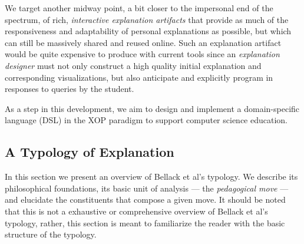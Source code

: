 \documentclass[conference]{IEEEtran}
\begin{document}
We target another midway point, a bit closer to the impersonal end of the
spectrum, of rich, \emph{interactive explanation artifacts} that provide as
much of the responsiveness and adaptability of personal explanations as
possible, but which can still be massively shared and reused online. Such an
explanation artifact would be quite expensive to produce with current tools
since an \emph{explanation designer} must not only construct a high quality
initial explanation and corresponding visualizations, but also anticipate and
explicitly program in responses to queries by the student.




As a step in this development, we aim to design and implement a domain-specific
language (DSL) in the XOP paradigm to support computer science education. 


\subsection{A Typology of Explanation}
\label{sec:back:typology}

In this section we present an overview of Bellack et al's typology. We describe
its philosophical foundations, its basic unit of analysis --- the
\emph{pedagogical move} --- and elucidate the constituents that compose a given
move. It should be noted that this is not a exhaustive or comprehensive overview
of Bellack et al's typology, rather, this section is meant to familiarize the
reader with the basic structure of the typology.
\end{document}
